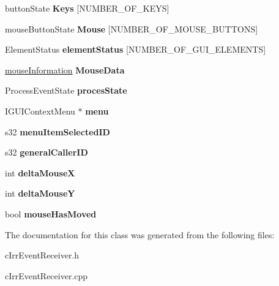 \begin{DoxyCompactItemize}
\item 
\hypertarget{class_c_irr_event_receiver_ac0269b066ae11e7b69dfa67f7fcd4677}{
buttonState {\bfseries Keys} \mbox{[}NUMBER\_\-OF\_\-KEYS\mbox{]}}
\label{class_c_irr_event_receiver_ac0269b066ae11e7b69dfa67f7fcd4677}

\item 
\hypertarget{class_c_irr_event_receiver_a77c4817fb135a929770c32ba7cb1a995}{
mouseButtonState {\bfseries Mouse} \mbox{[}NUMBER\_\-OF\_\-MOUSE\_\-BUTTONS\mbox{]}}
\label{class_c_irr_event_receiver_a77c4817fb135a929770c32ba7cb1a995}

\item 
\hypertarget{class_c_irr_event_receiver_a690c327d5ee4ee84080799a49e5b8ce6}{
ElementStatus {\bfseries elementStatus} \mbox{[}NUMBER\_\-OF\_\-GUI\_\-ELEMENTS\mbox{]}}
\label{class_c_irr_event_receiver_a690c327d5ee4ee84080799a49e5b8ce6}

\item 
\hypertarget{class_c_irr_event_receiver_a494e12d9339e6bd5c743c1ac378e528a}{
\hyperlink{structmouse_information}{mouseInformation} {\bfseries MouseData}}
\label{class_c_irr_event_receiver_a494e12d9339e6bd5c743c1ac378e528a}

\item 
\hypertarget{class_c_irr_event_receiver_afec1471ecee16416474fa03c88abbcd7}{
ProcessEventState {\bfseries procesState}}
\label{class_c_irr_event_receiver_afec1471ecee16416474fa03c88abbcd7}

\item 
\hypertarget{class_c_irr_event_receiver_a0d3db48e55cef3a5172a5674653a8952}{
IGUIContextMenu $\ast$ {\bfseries menu}}
\label{class_c_irr_event_receiver_a0d3db48e55cef3a5172a5674653a8952}

\item 
\hypertarget{class_c_irr_event_receiver_ae1c9d267958d094d75f1cc9229be58ea}{
s32 {\bfseries menuItemSelectedID}}
\label{class_c_irr_event_receiver_ae1c9d267958d094d75f1cc9229be58ea}

\item 
\hypertarget{class_c_irr_event_receiver_a1e015fb360345f4a4a18dbcef90c7d8c}{
s32 {\bfseries generalCallerID}}
\label{class_c_irr_event_receiver_a1e015fb360345f4a4a18dbcef90c7d8c}

\item 
\hypertarget{class_c_irr_event_receiver_a0be43ac696ae346a894c912586ff7925}{
int {\bfseries deltaMouseX}}
\label{class_c_irr_event_receiver_a0be43ac696ae346a894c912586ff7925}

\item 
\hypertarget{class_c_irr_event_receiver_af0f0481682f20e8fc5ab8528c49ab29b}{
int {\bfseries deltaMouseY}}
\label{class_c_irr_event_receiver_af0f0481682f20e8fc5ab8528c49ab29b}

\item 
\hypertarget{class_c_irr_event_receiver_a62d7e1157ab54b47b47fea173e1cc5d6}{
bool {\bfseries mouseHasMoved}}
\label{class_c_irr_event_receiver_a62d7e1157ab54b47b47fea173e1cc5d6}

\end{DoxyCompactItemize}


The documentation for this class was generated from the following files:\begin{DoxyCompactItemize}
\item 
cIrrEventReceiver.h\item 
cIrrEventReceiver.cpp\end{DoxyCompactItemize}
